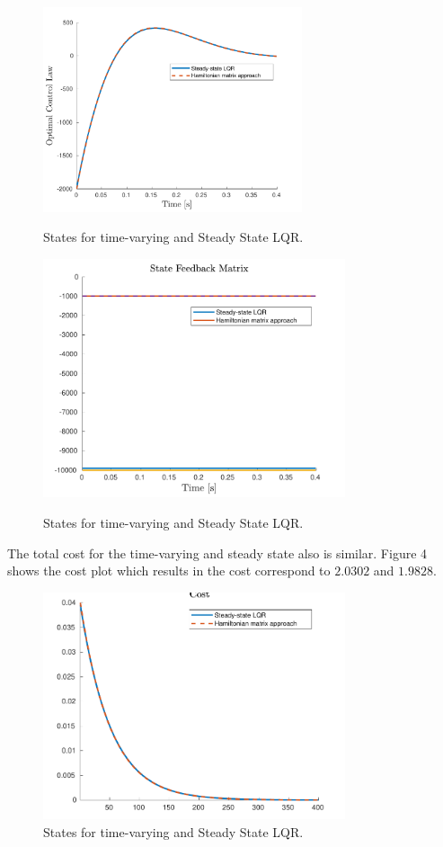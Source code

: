 \documentclass{article}
\begin{document}
\begin{figure}[H] 
\centering
\includegraphics [width=3in]{control3} \label{control3}
\caption{States for time-varying and Steady State LQR.}
\end{figure}

\begin{figure}[H] 
\centering
\includegraphics [width=3.5in]{gain3} \label{gain3}
\caption{States for time-varying and Steady State LQR.}
\end{figure}

The total cost for the time-varying and steady state also is similar. Figure 4 shows the cost plot which results in the cost correspond to $2.0302$ and $1.9828$.

\begin{figure}[H]
\centering
\includegraphics [width=3.5in]{cost3}
\caption{States for time-varying and Steady State LQR.}
\end{figure}
\end{document}
